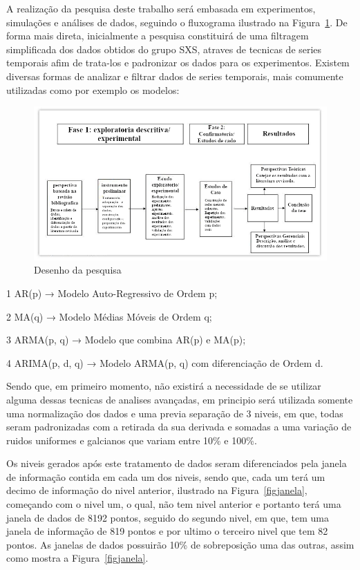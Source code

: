 A realização da pesquisa deste trabalho será embasada em experimentos, simulações e análises de dados, seguindo o fluxograma ilustrado na Figura~\ref{figpesquisa}. De forma mais direta, inicialmente a pesquisa constituirá de uma filtragem simplificada dos dados obtidos do grupo SXS, atraves de tecnicas de series temporais afim de trata-los e padronizar os dados para os experimentos. Existem diversas formas de analizar e filtrar dados de series temporais, mais comumente utilizadas como por exemplo os modelos:

\begin{figure}[ht]
\centering
\includegraphics[width=1\textwidth]{figuras/desenho_da_pesquisa.png}
\caption{Desenho da pesquisa}
\label{figpesquisa}
\end{figure}

1 AR(p) → Modelo Auto-Regressivo de Ordem p;

2 MA(q) → Modelo Médias Móveis de Ordem q;

3 ARMA(p, q) → Modelo que combina AR(p) e MA(p);

4 ARIMA(p, d, q) → Modelo ARMA(p, q) com diferenciação de Ordem d.

Sendo que, em primeiro momento, não existirá a necessidade de se utilizar alguma dessas tecnicas de analises avançadas, em principio será utilizada somente uma normalização dos dados e uma previa separação de 3 niveis, em que, todas seram padronizadas com a retirada da sua derivada e somadas a uma variação de ruidos uniformes e galcianos que variam entre 10\% e 100\%.

Os niveis gerados após este tratamento de dados seram diferenciados pela janela de informação contida em cada um dos niveis, sendo que, cada um terá um decimo de informação do nivel anterior, ilustrado na Figura~\ref{figjanela}, começando com o nivel um, o qual, não tem nivel anterior e portanto terá uma janela de dados de 8192 pontos, seguido do segundo nivel, em que, tem uma janela de informação de 819 pontos e por ultimo o terceiro nivel que tem 82 pontos. As janelas de dados possuirão 10\% de sobreposição uma das outras, assim como mostra a Figura~\ref{figjanela}.

